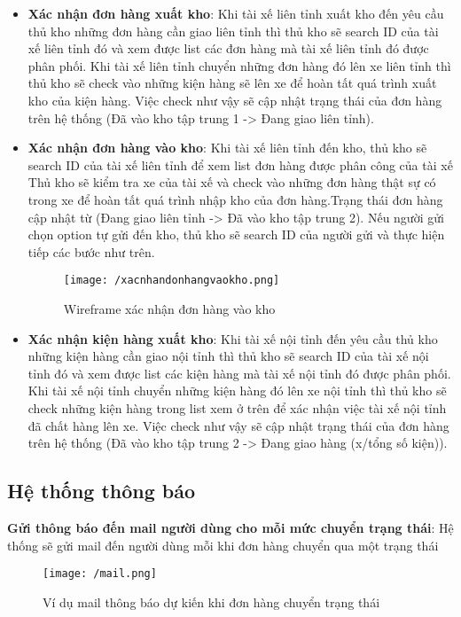 \begin{itemize}
\begin{itemize}
		\item \textbf{Xác nhận đơn hàng xuất kho}: Khi tài xế liên tỉnh xuất kho đến yêu cầu thủ kho những đơn hàng cần giao liên tỉnh thì thủ kho sẽ search ID của tài xế liên tỉnh đó và xem được list các đơn hàng mà tài xế liên tỉnh đó được phân phối. Khi tài xế liên tỉnh chuyển những đơn hàng đó lên xe liên tỉnh thì thủ kho sẽ check vào những kiện hàng sẽ lên xe để hoàn tất quá trình xuất kho của kiện hàng. Việc check như vậy sẽ cập nhật trạng thái của đơn hàng trên hệ thống (Đã vào kho tập trung 1 -> Đang giao liên tỉnh).
		\item \textbf{Xác nhận đơn hàng vào kho}: Khi tài xế liên tỉnh đến kho, thủ kho sẽ search ID của tài xế liên tỉnh để xem list đơn hàng được phân công của tài xế Thủ kho sẽ kiểm tra xe của tài xế và check vào những đơn hàng thật sự có trong xe để hoàn tất quá trình nhập kho của đơn hàng.Trạng thái đơn hàng cập nhật từ (Đang giao liên tỉnh -> Đã vào kho tập trung 2). Nếu người gửi chọn option tự gửi đến kho, thủ kho sẽ search ID của người gửi và thực hiện tiếp các bước như trên. 
		
		\newpage
		
		\begin{figure}[!ht]
			\texttt{[image: /xacnhandonhangvaokho.png]}
			\centering
			\linebreak
			\caption{Wireframe xác nhận đơn hàng vào kho}
		\end{figure}
		
		\item \textbf{Xác nhận kiện hàng xuất kho}: Khi tài xế nội tỉnh đến yêu cầu thủ kho những kiện hàng cần giao nội tỉnh thì thủ kho sẽ search ID của tài xế nội tỉnh đó và xem được list các kiện hàng mà tài xế nội tỉnh đó được phân phối. Khi tài xế nội tỉnh chuyển những kiện hàng đó lên xe nội tỉnh thì thủ kho sẽ check những kiện hàng trong list xem ở trên để xác nhận việc tài xế nội tỉnh đã chất hàng lên xe. Việc check như vậy sẽ cập nhật trạng thái của đơn hàng trên hệ thống (Đã vào kho tập trung 2 -> Đang giao hàng (x/tổng số kiện)).
	\end{itemize}
	\subsection{Hệ thống thông báo}
	\textbf{Gửi thông báo đến mail người dùng cho mỗi mức chuyển trạng thái}: Hệ thống sẽ gửi mail đến người dùng mỗi khi đơn hàng chuyển qua một trạng thái
	
	\begin{figure}[!ht]
		\texttt{[image: /mail.png]}
		\centering
		\linebreak
		\caption{Ví dụ mail thông báo dự kiến khi đơn hàng chuyển trạng thái}
	\end{figure}
	
\end{itemize}